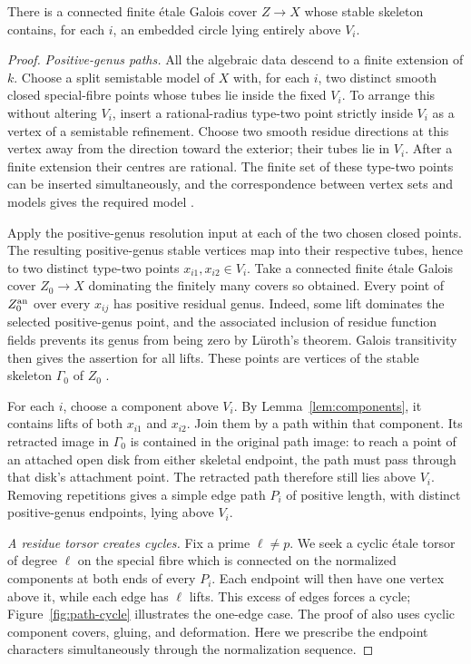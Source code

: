 \begin{proposition}\label{prop:cycles}
There is a connected finite \'etale Galois cover $Z\to X$ whose stable
skeleton contains, for each $i$, an embedded circle lying entirely
above $V_i$.
\end{proposition}
\begin{proof}
\emph{Positive-genus paths.}
All the algebraic data descend to a finite extension of $k$. Choose
a split semistable model of $X$ with, for each $i$, two distinct smooth
closed special-fibre points whose tubes lie inside the fixed $V_i$.
To arrange this without altering $V_i$, insert a rational-radius
type-two point strictly inside $V_i$ as a vertex of a semistable
refinement. Choose two smooth residue directions at this vertex away
from the direction toward the exterior; their tubes lie in $V_i$.
After a finite extension their centres are rational. The finite set
of these type-two points can be inserted simultaneously, and the
correspondence between vertex sets and models gives the required
model \cite[Proposition~3.13(3) and Theorem~4.11]{BakerPayneRabinoff}.

Apply the positive-genus resolution input at each of the two chosen
closed points. The resulting positive-genus stable vertices map into
their respective tubes, hence to two distinct type-two points
$x_{i1},x_{i2}\in V_i$. Take a connected finite \'etale Galois cover
$Z_0\to X$ dominating the finitely many covers so obtained.
Every point of $Z_0^{\rm an}$ over every $x_{ij}$ has positive residual
genus. Indeed, some lift dominates the selected positive-genus point,
and the associated inclusion of residue function fields prevents its
genus from being zero by L\"uroth's theorem. Galois transitivity then
gives the assertion for all lifts. These points are vertices of the
stable skeleton $\Gamma_0$ of $Z_0$
\cite[Theorem~4.22(2)]{BakerPayneRabinoff}.

For each $i$, choose a component above $V_i$. By
Lemma~\ref{lem:components}, it contains lifts of both $x_{i1}$ and
$x_{i2}$. Join them by a path within that component. Its retracted
image in $\Gamma_0$ is contained in the original path image:
to reach a point of an attached open disk from either skeletal
endpoint, the path must pass through that disk's attachment point.
The retracted path therefore still lies above $V_i$. Removing
repetitions gives a simple edge path $P_i$ of positive length, with
distinct positive-genus endpoints, lying above $V_i$.

\smallskip\noindent
\emph{A residue torsor creates cycles.}
Fix a prime $\ell\ne p$. We seek a cyclic \'etale torsor of degree
$\ell$ on the special fibre which is connected on the normalized
components at both ends of every $P_i$. Each endpoint will then have
one vertex above it, while each edge has $\ell$ lifts. This excess of
edges forces a cycle; Figure~\ref{fig:path-cycle} illustrates the
one-edge case. The proof of \cite[Proposition~2.6]{MochizukiTsujimura}
also uses cyclic component covers, gluing, and deformation. Here we
prescribe the endpoint characters simultaneously through the
normalization sequence.


\end{proof}
